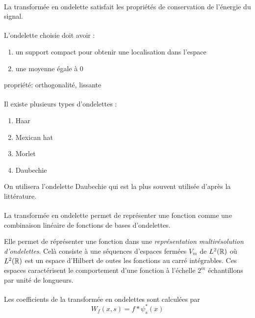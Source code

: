 \paragraph{}
La transformée en ondelette satisfait les propriétés de conservation de l'énergie du signal.



\paragraph{}
L'ondelette choisie doit avoir :
\begin{enumerate}
\item un support compact pour obtenir une localisation dans l'espace
\item une moyenne égale à 0


\end{enumerate}
propriété:
 orthogonalité, lissante
\paragraph{}
Il existe plusieurs types d'ondelettes :
\begin{enumerate}
\item Haar
\item Mexican hat
\item Morlet
\item Daubechie

\end{enumerate}

On utilisera l'ondelette Daubechie qui est la plus souvent utilisée d'après la littérature.

\paragraph{}
La transformée en ondelette permet de représenter une fonction comme une combinaison linéaire de fonctions de bases d'ondelettes.

Elle permet de réprésenter une fonction dans une \emph{représentation multirésolution d'ondelettes}. Celà consiste à une séquences d'espaces fermées $V_{m}$ de $ L^{2}(\mathbb{R})$ où
$L^{2}(\mathbb{R})$ est un espace d'Hilbert de outes les fonctions au carré intégrables.
Ces espaces caractérisent le comportement d'une fonction à l'échelle $2^{m}$ échantillons par unité de longueurs.


\paragraph{}
Les coefficients de la transformée en ondelettes sont calculées par
\begin{equation}
W_{f}(x,s) = f * \psi^{*}_{s}(x)
\end{equation}

